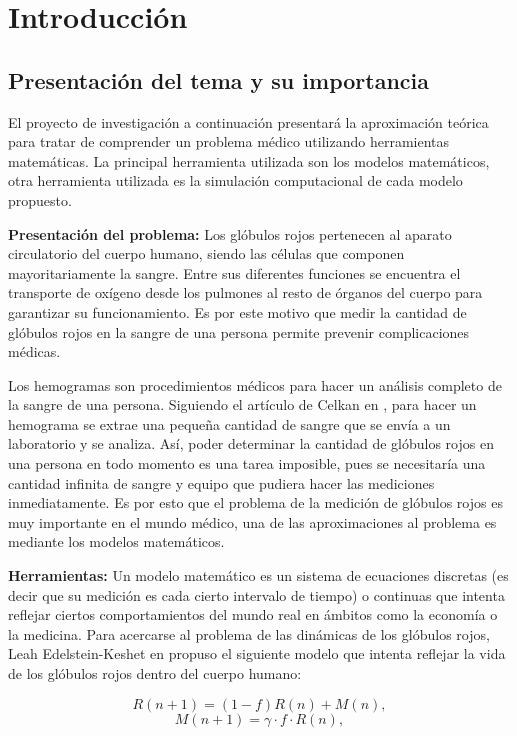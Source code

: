 \chapter{Introducción}\label{chap:intro}

\section{Presentación del tema y su importancia}

El proyecto de investigación a continuación presentará la aproximación teórica para tratar de comprender un problema médico utilizando herramientas matemáticas. La principal herramienta utilizada son los modelos matemáticos, otra herramienta utilizada es la simulación computacional de cada modelo propuesto. 

\textbf{Presentación del problema:} Los glóbulos rojos pertenecen al aparato circulatorio del cuerpo humano, siendo las células que componen mayoritariamente la sangre. Entre sus diferentes funciones se encuentra el transporte de oxígeno desde los pulmones al resto de órganos del cuerpo para garantizar su funcionamiento. Es por este motivo que medir la cantidad de glóbulos rojos en la sangre de una persona permite prevenir complicaciones médicas.

Los hemogramas son procedimientos médicos para hacer un análisis completo de la sangre de una persona. Siguiendo el artículo de Celkan en \cite{celkan2020does}, para hacer un hemograma se extrae una pequeña cantidad de sangre que se envía a un laboratorio y se analiza. Así, poder determinar la cantidad de glóbulos rojos en una persona en todo momento es una tarea imposible, pues se necesitaría una cantidad infinita de sangre y equipo que pudiera hacer las mediciones inmediatamente. Es por esto que el problema de la medición de glóbulos rojos es muy importante en el mundo médico, una de las aproximaciones al problema es mediante los modelos matemáticos.

\textbf{Herramientas:} Un modelo matemático es un sistema de ecuaciones discretas (es decir que su medición es cada cierto intervalo de tiempo) o continuas que intenta reflejar ciertos comportamientos del mundo real en ámbitos como la economía o la medicina. Para acercarse al problema de las dinámicas de los glóbulos rojos, Leah Edelstein-Keshet en \cite{edelstein2005} propuso el siguiente modelo que intenta reflejar la vida de los glóbulos rojos dentro del cuerpo humano:

$$R(n+1)=(1-f)R(n)+M(n),$$
$$M(n+1)=\gamma \cdot f\cdot R(n),$$

